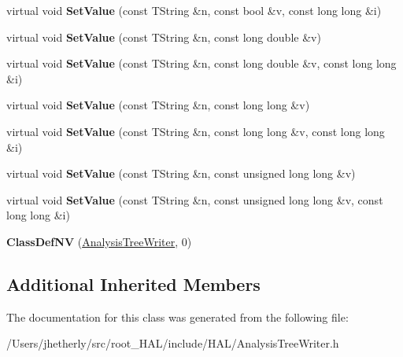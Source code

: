 \begin{DoxyCompactItemize}
\item 
\hypertarget{class_h_a_l_1_1_analysis_tree_writer_a85b8b7790bb9392ed1d865daab3248d7}{virtual void {\bfseries Set\-Value} (const T\-String \&n, const bool \&v, const long long \&i)}\label{class_h_a_l_1_1_analysis_tree_writer_a85b8b7790bb9392ed1d865daab3248d7}

\item 
\hypertarget{class_h_a_l_1_1_analysis_tree_writer_a2e68fdea10ca87aebab5332c2b680286}{virtual void {\bfseries Set\-Value} (const T\-String \&n, const long double \&v)}\label{class_h_a_l_1_1_analysis_tree_writer_a2e68fdea10ca87aebab5332c2b680286}

\item 
\hypertarget{class_h_a_l_1_1_analysis_tree_writer_ae4fbd939b2edfc2c3859ca24f635a475}{virtual void {\bfseries Set\-Value} (const T\-String \&n, const long double \&v, const long long \&i)}\label{class_h_a_l_1_1_analysis_tree_writer_ae4fbd939b2edfc2c3859ca24f635a475}

\item 
\hypertarget{class_h_a_l_1_1_analysis_tree_writer_a73bed978557c7222f4c88b71c1b74424}{virtual void {\bfseries Set\-Value} (const T\-String \&n, const long long \&v)}\label{class_h_a_l_1_1_analysis_tree_writer_a73bed978557c7222f4c88b71c1b74424}

\item 
\hypertarget{class_h_a_l_1_1_analysis_tree_writer_abc1b0d49980dfe48e99cf3c03f271bb3}{virtual void {\bfseries Set\-Value} (const T\-String \&n, const long long \&v, const long long \&i)}\label{class_h_a_l_1_1_analysis_tree_writer_abc1b0d49980dfe48e99cf3c03f271bb3}

\item 
\hypertarget{class_h_a_l_1_1_analysis_tree_writer_ad7fc39378d544f275cbb19145def8fbf}{virtual void {\bfseries Set\-Value} (const T\-String \&n, const unsigned long long \&v)}\label{class_h_a_l_1_1_analysis_tree_writer_ad7fc39378d544f275cbb19145def8fbf}

\item 
\hypertarget{class_h_a_l_1_1_analysis_tree_writer_ae71437812731ea60b3375c771ff912e1}{virtual void {\bfseries Set\-Value} (const T\-String \&n, const unsigned long long \&v, const long long \&i)}\label{class_h_a_l_1_1_analysis_tree_writer_ae71437812731ea60b3375c771ff912e1}

\item 
\hypertarget{class_h_a_l_1_1_analysis_tree_writer_a77da0342b01b89846c418b825d3a9d99}{{\bfseries Class\-Def\-N\-V} (\hyperlink{class_h_a_l_1_1_analysis_tree_writer}{Analysis\-Tree\-Writer}, 0)}\label{class_h_a_l_1_1_analysis_tree_writer_a77da0342b01b89846c418b825d3a9d99}

\end{DoxyCompactItemize}
\subsection*{Additional Inherited Members}


The documentation for this class was generated from the following file\-:\begin{DoxyCompactItemize}
\item 
/\-Users/jhetherly/src/root\-\_\-\-H\-A\-L/include/\-H\-A\-L/Analysis\-Tree\-Writer.\-h\end{DoxyCompactItemize}

